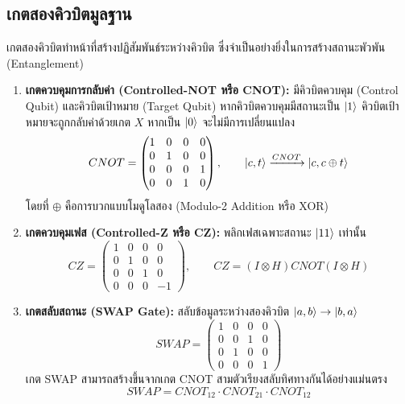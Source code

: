 \subsection{เกตสองคิวบิตมูลฐาน}
เกตสองคิวบิตทำหน้าที่สร้างปฏิสัมพันธ์ระหว่างคิวบิต ซึ่งจำเป็นอย่างยิ่งในการสร้างสถานะพัวพัน (Entanglement)
\begin{enumerate}
    \item \textbf{เกตควบคุมการกลับค่า (Controlled-NOT หรือ CNOT):} มีคิวบิตควบคุม (Control Qubit) และคิวบิตเป้าหมาย (Target Qubit) หากคิวบิตควบคุมมีสถานะเป็น $\ket{1}$ คิวบิตเป้าหมายจะถูกกลับค่าด้วยเกต $X$ หากเป็น $\ket{0}$ จะไม่มีการเปลี่ยนแปลง
    \begin{equation}
    CNOT = \begin{pmatrix}
    1 & 0 & 0 & 0 \\
    0 & 1 & 0 & 0 \\
    0 & 0 & 0 & 1 \\
    0 & 0 & 1 & 0
    \end{pmatrix}, \qquad \ket{c, t} \xrightarrow{CNOT} \ket{c, c \oplus t}
    \label{eq:cnot_matrix}
    \end{equation}
    โดยที่ $\oplus$ คือการบวกแบบโมดูโลสอง (Modulo-2 Addition หรือ XOR)
    \item \textbf{เกตควบคุมเฟส (Controlled-Z หรือ CZ):} พลิกเฟสเฉพาะสถานะ $\ket{11}$ เท่านั้น
    \begin{equation}
    CZ = \begin{pmatrix}
    1 & 0 & 0 & 0 \\
    0 & 1 & 0 & 0 \\
    0 & 0 & 1 & 0 \\
    0 & 0 & 0 & -1
    \end{pmatrix}, \qquad CZ = (I \otimes H) CNOT (I \otimes H)
    \end{equation}
    \item \textbf{เกตสลับสถานะ (SWAP Gate):} สลับข้อมูลระหว่างสองคิวบิต $\ket{a, b} \to \ket{b, a}$
    \begin{equation}
    SWAP = \begin{pmatrix}
    1 & 0 & 0 & 0 \\
    0 & 0 & 1 & 0 \\
    0 & 1 & 0 & 0 \\
    0 & 0 & 0 & 1
    \end{pmatrix}
    \end{equation}
    เกต SWAP สามารถสร้างขึ้นจากเกต CNOT สามตัวเรียงสลับทิศทางกันได้อย่างแม่นตรง
    \begin{equation}
    SWAP = CNOT_{12} \cdot CNOT_{21} \cdot CNOT_{12}
    \label{eq:swap_from_cnots}
    \end{equation}
\end{enumerate}

